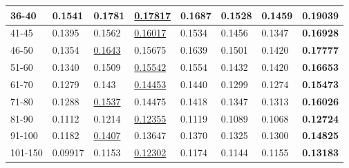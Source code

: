 \begin{table}[]
\begin{tabular}{|l|l|l|l|l|l|l||l|}
        36-40       & 0.1541                         & 0.1781                         & \underline{0.17817}            & 0.1687                         & 0.1528                         & 0.1459                          & \textbf{0.19039}           \\ \hline
        41-45       & 0.1395                         & 0.1562                         & \underline{0.16017}            & 0.1534                         & 0.1456                         & 0.1347                          & \textbf{0.16928}           \\ \hline
        46-50       & 0.1354                         & \underline{0.1643}             & 0.15675                        & 0.1639                         & 0.1501                         & 0.1420                          & \textbf{0.17777}           \\ \hline
        51-60       & 0.1340                         & 0.1509                         & \underline{0.15542}            & 0.1554                         & 0.1432                         & 0.1420                          & \textbf{0.16653}           \\ \hline
        61-70       & 0.1279                         & 0.143                          & \underline{0.14453}            & 0.1440                         & 0.1299                         & 0.1274                          & \textbf{0.15473}           \\ \hline
        71-80       & 0.1288                         & \underline{0.1537}             & 0.14475                        & 0.1418                         & 0.1347                         & 0.1313                          & \textbf{0.16026}           \\ \hline
        81-90       & 0.1112                         & 0.1214                         & \underline{0.12355}            & 0.1119                         & 0.1089                         & 0.1068                          & \textbf{0.12724}           \\ \hline
        91-100      & 0.1182                         & \underline{0.1407}             & 0.13647                        & 0.1370                         & 0.1325                         & 0.1300                          & \textbf{0.14825}           \\ \hline
        101-150     & 0.09917                        & 0.1153                         & \underline{0.12302}            & 0.1174                         & 0.1144                         & 0.1155                          & \textbf{0.13183}           \\ \hline

\end{tabular}
\end{table}
